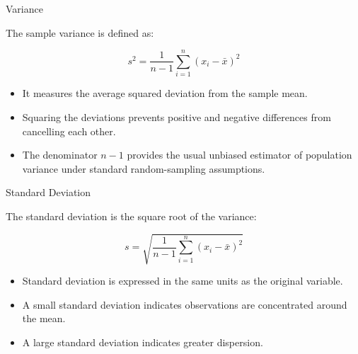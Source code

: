\documentclass{beamer}
\begin{document}
\begin{frame}{Variance}

The sample variance is defined as:

\vskip 0.5cm

\[
s^2 =
\frac{1}{n-1}
\sum_{i=1}^{n}
(x_i-\bar{x})^2
\]

\vskip 0.5cm

\begin{itemize}

  \item It measures the average squared deviation from the sample mean.

  \item Squaring the deviations prevents positive and negative differences from cancelling each other.

  \item The denominator $n-1$ provides the usual unbiased estimator of population variance under standard random-sampling assumptions.

\end{itemize}

\end{frame}


\begin{frame}{Standard Deviation}

The standard deviation is the square root of the variance:

\vskip 0.5cm

\[
s =
\sqrt{
\frac{1}{n-1}
\sum_{i=1}^{n}
(x_i-\bar{x})^2
}
\]

\vskip 0.5cm

\begin{itemize}

  \item Standard deviation is expressed in the same units as the original variable.

  \item A small standard deviation indicates observations are concentrated around the mean.

  \item A large standard deviation indicates greater dispersion.

\end{itemize}

\end{frame}
\end{document}
